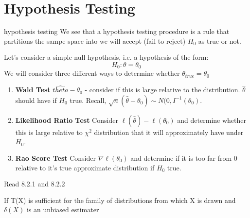 \documentclass[11pt,fleqn]{book} %
\begin{document}
\chapter{Hypothesis Testing}

\begin{definition}{hypothesis testing}
	We see that a hypothesis testing procedure is a rule that partitions the sampe space into we will accept (fail to reject) $H_0$ as true or not.
\end{definition}

Let's consider a simple null hypothesis, i.e. a hypothesis of the form:
$$H_0: \theta=\theta_0 $$
We will consider three different ways to determine whether $\theta_{true} = \theta_0$

\begin{enumerate}
	\item \textbf{Wald Test} $\hat{theta} - \theta_0$ - consider if this is large relative to the distribution. $\hat{\theta}$ should have if $H_0$ true. Recall, $\sqrt{n}(\hat{\theta}-\theta_0)\sim N(0,I^{-1}(\theta_0)$.
	\item \textbf{Likelihood Ratio Test} Consider $\ell(\hat{\theta}) - \ell(\theta_0)$ and determine whether this is large relative to $\chi^2$ distribution that it will approximately have under $H_0$. 
	\item \textbf{Rao Score Test} Consider $\nabla\ell(\theta_0)$ and determine if it is too far from 0 relative to it's true approximate distribution if $H_0$ true.  
\end{enumerate}

\begin{remark}
	Read 8.2.1 and 8.2.2
\end{remark}

\begin{theorem}
	If T(X) is sufficient for the family of distributions from which X is drawn and $\delta(X)$ is an unbiased estimater 
\end{theorem}

\end{document}
